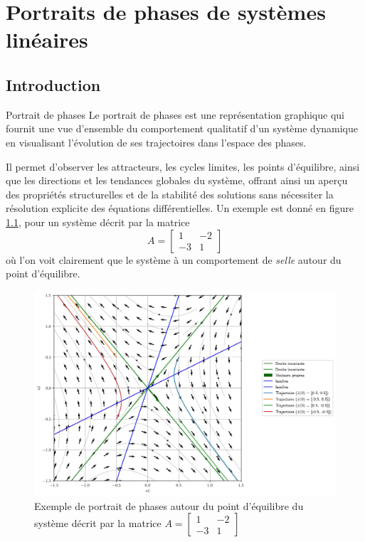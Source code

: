 \chapter{Portraits de phases de systèmes linéaires}\label{chap:portrait_phases}
    \section{Introduction}
        \begin{definition}{Portrait de phases}
            Le portrait de phases est une représentation graphique qui fournit une vue d'ensemble du comportement qualitatif d'un système dynamique en visualisant l'évolution de ses trajectoires dans l'espace des phases.
        \end{definition}
        Il permet d'observer les attracteurs, les cycles limites, les points d'équilibre, ainsi que les directions et les tendances globales du système, offrant ainsi un aperçu des propriétés structurelles et de la stabilité des solutions sans nécessiter la résolution explicite des équations différentielles. Un exemple est donné en figure \ref{fig:exemple_portrait_de_phases}, pour un système décrit par la matrice
        \begin{equation}
            A = \begin{bmatrix}1 & -2\\-3 & 1\end{bmatrix}
        \end{equation}
        où l'on voit clairement que le système à un comportement de \textit{selle} autour du point d'équilibre.

        \begin{figure}[ht!]
            \centering
            \includegraphics[width=\textwidth]{images/exemple_portrait_de_phases.jpg}
            \caption{Exemple de portrait de phases autour du point d'équilibre du système décrit par la matrice $A = \begin{bmatrix}1 & -2\\-3 & 1\end{bmatrix}$}
            \label{fig:exemple_portrait_de_phases}
        \end{figure}

